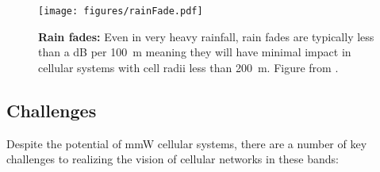 \documentclass[journal]{IEEEtran}
\begin{document}
\begin{figure}
    \centering
    \texttt{[image: figures/rainFade.pdf]}
    \caption{\textbf{Rain fades:}  Even in very heavy rainfall, rain fades
    are typically less than a dB per 100~m meaning they will have minimal impact
    in cellular systems with cell radii less than 200~m.  Figure from \cite{Nie72G-PIMRC:13}.}
    \label{fig:rainFade}
\end{figure}



\subsection{Challenges} \label{sec:challenges}

Despite the potential of mmW cellular systems,
there are a number of key challenges to realizing
the vision of cellular networks in these bands:
\end{document}

